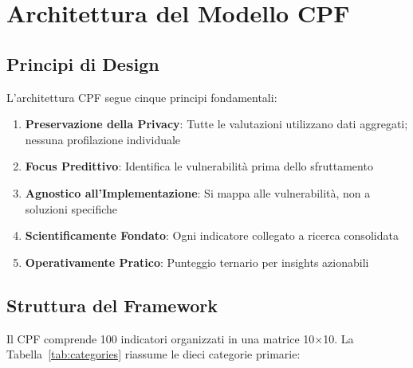 \documentclass[11pt,a4paper]{article}
\begin{document}
\section{Architettura del Modello CPF}

\subsection{Principi di Design}

L'architettura CPF segue cinque principi fondamentali:
\begin{enumerate}
\item \textbf{Preservazione della Privacy}: Tutte le valutazioni utilizzano dati aggregati; nessuna profilazione individuale
\item \textbf{Focus Predittivo}: Identifica le vulnerabilità prima dello sfruttamento
\item \textbf{Agnostico all'Implementazione}: Si mappa alle vulnerabilità, non a soluzioni specifiche
\item \textbf{Scientificamente Fondato}: Ogni indicatore collegato a ricerca consolidata
\item \textbf{Operativamente Pratico}: Punteggio ternario per insights azionabili
\end{enumerate}

\subsection{Struttura del Framework}

Il CPF comprende 100 indicatori organizzati in una matrice 10×10. La Tabella~\ref{tab:categories} riassume le dieci categorie primarie:
\end{document}

